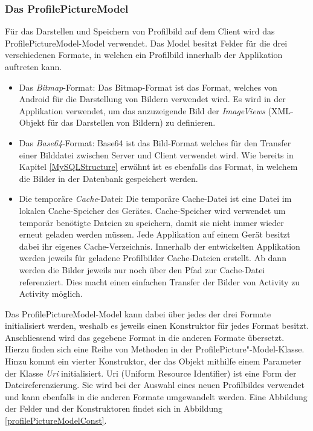 \documentclass[../main.tex]{subfiles}
\begin{document}
	\subsubsection{Das ProfilePictureModel}
	Für das Darstellen und Speichern von Profilbild auf dem Client wird das ProfilePictureModel-Model verwendet. Das Model besitzt Felder für die drei verschiedenen Formate, in welchen ein Profilbild innerhalb der Applikation auftreten kann.
	
	\begin{itemize}
		\item Das \emph{Bitmap}-Format: Das Bitmap-Format ist das Format, welches von Android für die Darstellung von Bildern verwendet wird. Es wird in der Applikation verwendet, um das anzuzeigende Bild der \emph{ImageViews} (XML-Objekt für das Darstellen von Bildern) zu definieren.
		\item Das \emph{Base64}-Format: Base64 ist das Bild-Format welches für den Transfer einer Bilddatei zwischen Server und Client verwendet wird. Wie bereits in Kapitel \ref{MySQLStructure} erwähnt ist es ebenfalls das Format, in welchem die Bilder in der Datenbank gespeichert werden.
		\item Die temporäre \emph{Cache}-Datei: Die temporäre Cache-Datei ist eine Datei im lokalen Cache-Speicher des Gerätes. Cache-Speicher wird verwendet um temporär benötigte Dateien zu speichern, damit sie nicht immer wieder erneut geladen werden müssen. Jede Applikation auf einem Gerät besitzt dabei ihr eigenes Cache-Verzeichnis. Innerhalb der entwickelten Applikation werden jeweils für geladene Profilbilder Cache-Dateien erstellt. Ab dann werden die Bilder jeweils nur noch über den Pfad zur Cache-Datei referenziert. Dies macht einen einfachen Transfer der Bilder von Activity zu Activity möglich. \cite{cache}
	\end{itemize}

	Das ProfilePictureModel-Model kann dabei über jedes der drei Formate initialisiert werden, weshalb es jeweils einen Konstruktor für jedes Format besitzt. Anschliessend wird das gegebene Format in die anderen Formate übersetzt. Hierzu finden sich eine Reihe von Methoden in der ProfilePicture"-Model-Klasse. Hinzu kommt ein vierter Konstruktor, der das Objekt mithilfe einem Parameter der Klasse \emph{Uri} initialisiert. Uri (Uniform Resource Identifier) ist eine Form der Dateireferenzierung. Sie wird bei der Auswahl eines neuen Profilbildes verwendet und kann ebenfalls in die anderen Formate umgewandelt werden. Eine Abbildung der Felder und der Konstruktoren findet sich in Abbildung \ref{profilePictureModelConst}.
	
\end{document}
